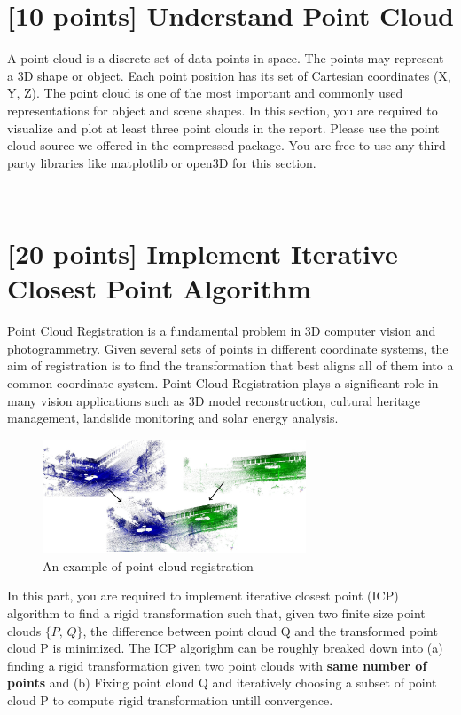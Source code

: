 \documentclass[]{article}
\begin{document}
\newpage


\section{[10 points] Understand Point Cloud}
A point cloud is a discrete set of data points in space. The points may represent a 3D shape or object. Each point position has its set of Cartesian coordinates (X, Y, Z). The point cloud is one of the most important and commonly used representations for object and scene shapes. In this section, you are required to visualize and plot at least three point clouds in the report. Please use the point cloud source we offered in the compressed package. You are free to use any third-party libraries like matplotlib or open3D for this section.


~\\

\section{[20 points] Implement Iterative Closest Point Algorithm}
Point Cloud Registration is a fundamental problem in 3D computer vision and photogrammetry. Given several sets of points in different coordinate systems, the aim of registration is to find the transformation that best aligns all of them into a common coordinate system. Point Cloud Registration plays a significant role in many vision applications such as 3D model reconstruction, cultural heritage management, landslide monitoring and solar energy analysis.
\begin{figure}[h]
    \centering
    \includegraphics[width=0.7\textwidth]{registration.png}
    \caption{An example of point cloud registration}
    \label{fig:registraion}
\end{figure}

In this part, you are required to implement iterative closest point (ICP) algorithm to find a rigid transformation such that, given two finite size point clouds $\{P,\, Q\}$, the difference between point cloud Q and the transformed point cloud P is minimized. The ICP algorighm can be roughly breaked down into (a) finding a rigid transformation given two point clouds with \textbf{same number of points} and (b) Fixing point cloud Q and iteratively choosing a subset of point cloud P to compute rigid transformation untill convergence.
\end{document}
